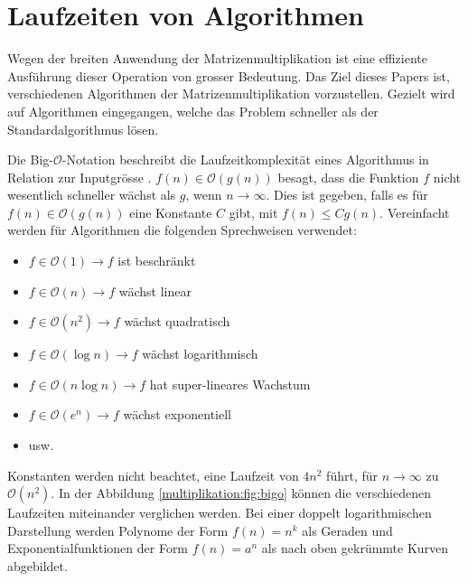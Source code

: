 %
%
%
\section{Laufzeiten von Algorithmen}
Wegen der breiten Anwendung der Matrizenmultiplikation ist eine effiziente Ausführung dieser Operation von grosser Bedeutung.
Das Ziel dieses Papers ist, verschiedenen Algorithmen der Matrizenmultiplikation vorzustellen.
Gezielt wird auf Algorithmen eingegangen, welche das Problem schneller als der Standardalgorithmus l\"osen.

\label{muliplikation:sec:bigo}
Die Big-$\mathcal{O}$-Notation beschreibt die Laufzeitkomplexit\"at eines Algorithmus in Relation zur Inputgrösse \cite{multiplikation:bigo}.
%
%
$f(n) \in \mathcal{O}(g(n))$ besagt, dass die Funktion $f$ nicht wesentlich schneller w\"achst als $g$, wenn $n \rightarrow \infty$.
Dies ist gegeben, falls es für $f(n) \in \mathcal{O}(g(n))$ eine Konstante $C$ gibt, mit $f(n) \leq Cg(n)$.
Vereinfacht werden f\"ur Algorithmen die folgenden Sprechweisen verwendet:
\begin{itemize}
	\item $f \in \mathcal{O}(1) \rightarrow f$ ist beschr\"ankt
	\item $f \in \mathcal{O}(n) \rightarrow f$ w\"achst linear
	\item $f \in \mathcal{O}  (n^2   ) \rightarrow f$ w\"achst quadratisch
	\item $f \in \mathcal{O}(\log n) \rightarrow f$ w\"achst logarithmisch
	\item $f \in \mathcal{O}(n \log n) \rightarrow f$ hat super-lineares Wachstum
	\item $f \in \mathcal{O}  (e^n   ) \rightarrow f$ w\"achst exponentiell
	\item usw.
\end{itemize}

Konstanten werden nicht beachtet, eine Laufzeit von  $4n^2$ führt, für $n \rightarrow \infty$ zu $\mathcal{O}(n^2)$.
In der Abbildung \ref{multiplikation:fig:bigo} k\"onnen die verschiedenen Laufzeiten miteinander verglichen werden.
Bei einer doppelt logarithmischen Darstellung werden Polynome der Form $f(n) = n^k$ als Geraden und Exponentialfunktionen der Form $f(n) = a^n$ als nach oben gekr\"ummte Kurven abgebildet.



